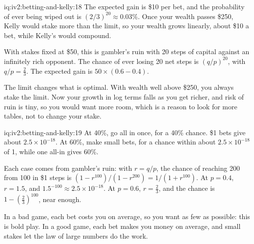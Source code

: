 \begin{solution}{iq:iv2:betting-and-kelly:18}
The expected gain is \$10 per bet, and the probability of ever being wiped out is $(2/3)^{20} \approx 0.03\%$. Once your wealth passes \$250, Kelly would stake more than the limit, so your wealth grows linearly, about \$10 a bet, while Kelly's would compound.

With stakes fixed at \$50, this is gambler's ruin with 20 steps of capital against an infinitely rich opponent. The chance of ever losing 20 net steps is $(q/p)^{20}$, with $q/p = \tfrac23$. The expected gain is $50 \times (0.6 - 0.4)$.

The limit changes what is optimal. With wealth well above \$250, you always stake the limit. Now your growth in log terms falls as you get richer, and risk of ruin is tiny, so you would want more room, which is a reason to look for more tables, not to change your stake.

\end{solution}

\begin{solution}{iq:iv2:betting-and-kelly:19}
At 40\%, go all in once, for a 40\% chance. \$1 bets give about $2.5 \times 10^{-18}$. At 60\%, make small bets, for a chance within about $2.5 \times 10^{-18}$ of 1, while one all-in gives 60\%.

Each case comes from gambler's ruin: with $r = q/p$, the chance of reaching 200 from 100 in \$1 steps is $(1 - r^{100})/(1 - r^{200}) = 1/(1 + r^{100})$. At $p = 0.4$, $r = 1.5$, and $1.5^{-100} \approx 2.5 \times 10^{-18}$. At $p = 0.6$, $r = \tfrac23$, and the chance is $1 - (\tfrac23)^{100}$, near enough.

In a bad game, each bet costs you on average, so you want as few as possible: this is bold play. In a good game, each bet makes you money on average, and small stakes let the law of large numbers do the work.

\end{solution}

